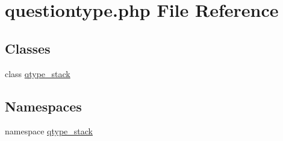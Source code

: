\hypertarget{questiontype_8php}{
\section{questiontype.php File Reference}
\label{questiontype_8php}
}
\subsection*{Classes}
\begin{DoxyCompactItemize}
\item 
class \hyperlink{classqtype__stack}{qtype\_\-stack}
\end{DoxyCompactItemize}
\subsection*{Namespaces}
\begin{DoxyCompactItemize}
\item 
namespace \hyperlink{namespaceqtype__stack}{qtype\_\-stack}
\end{DoxyCompactItemize}
